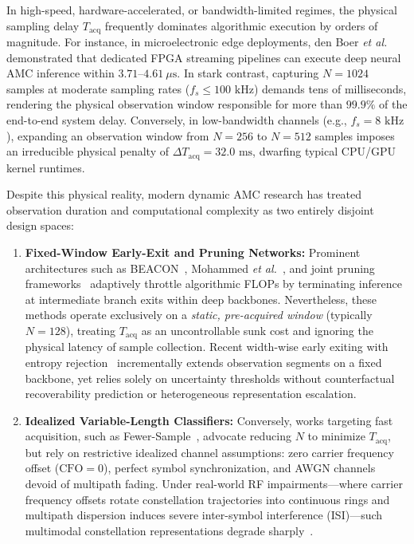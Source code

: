 In high-speed, hardware-accelerated, or bandwidth-limited regimes, the physical sampling delay $T_{\text{acq}}$ frequently dominates algorithmic execution by orders of magnitude. For instance, in microelectronic edge deployments, den Boer \emph{et al.}~\cite{denboer2021fpga} demonstrated that dedicated FPGA streaming pipelines can execute deep neural AMC inference within $3.71\text{--}4.61\ \mu\text{s}$. In stark contrast, capturing $N = 1024$ samples at moderate sampling rates ($f_s \le 100\text{ kHz}$) demands tens of milliseconds, rendering the physical observation window responsible for more than $99.9\%$ of the end-to-end system delay. Conversely, in low-bandwidth channels (e.g., $f_s = 8\text{ kHz}$), expanding an observation window from $N = 256$ to $N = 512$ samples imposes an irreducible physical penalty of $\Delta T_{\text{acq}} = 32.0\text{ ms}$, dwarfing typical CPU/GPU kernel runtimes.

Despite this physical reality, modern dynamic AMC research has treated observation duration and computational complexity as two entirely disjoint design spaces:
\begin{enumerate}
    \item \textbf{Fixed-Window Early-Exit and Pruning Networks:} Prominent architectures such as BEACON~\cite{liu2026beacon}, Mohammed \emph{et al.}~\cite{mohammed2023early}, and joint pruning frameworks~\cite{liu2025joint} adaptively throttle algorithmic FLOPs by terminating inference at intermediate branch exits within deep backbones. Nevertheless, these methods operate exclusively on a \emph{static, pre-acquired window} (typically $N=128$), treating $T_{\text{acq}}$ as an uncontrollable sunk cost and ignoring the physical latency of sample collection. Recent width-wise early exiting with entropy rejection~\cite{verbruggen2025width} incrementally extends observation segments on a fixed backbone, yet relies solely on uncertainty thresholds without counterfactual recoverability prediction or heterogeneous representation escalation.
    \item \textbf{Idealized Variable-Length Classifiers:} Conversely, works targeting fast acquisition, such as Fewer-Sample~\cite{guo2025fewer}, advocate reducing $N$ to minimize $T_{\text{acq}}$, but rely on restrictive idealized channel assumptions: zero carrier frequency offset ($\text{CFO} = 0$), perfect symbol synchronization, and AWGN channels devoid of multipath fading. Under real-world RF impairments—where carrier frequency offsets rotate constellation trajectories into continuous rings and multipath dispersion induces severe inter-symbol interference (ISI)—such multimodal constellation representations degrade sharply~\cite{sathyanarayanan2023rml22,wang2025survey}.
\end{enumerate}

